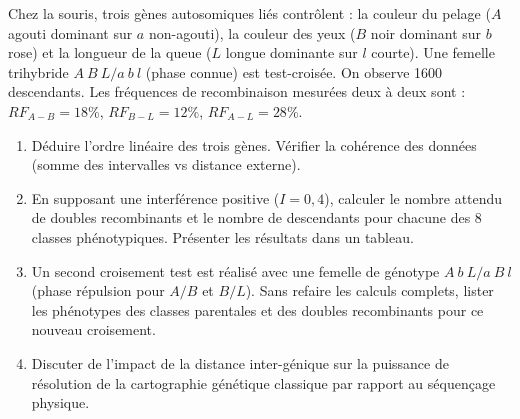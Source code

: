 \documentclass[11pt]{article}
\begin{document}
\begin{exercice}
Chez la souris, trois gènes autosomiques liés contrôlent : la couleur du pelage ($A$ agouti dominant sur $a$ non-agouti), la couleur des yeux ($B$ noir dominant sur $b$ rose) et la longueur de la queue ($L$ longue dominante sur $l$ courte).
Une femelle trihybride $A\ B\ L / a\ b\ l$ (phase connue) est test-croisée. On observe 1600 descendants.
Les fréquences de recombinaison mesurées deux à deux sont : $RF_{A-B} = 18\%$, $RF_{B-L} = 12\%$, $RF_{A-L} = 28\%$.
\begin{enumerate}
\item Déduire l'ordre linéaire des trois gènes. Vérifier la cohérence des données (somme des intervalles vs distance externe).
\item En supposant une interférence positive ($I = 0,4$), calculer le nombre attendu de doubles recombinants et le nombre de descendants pour chacune des 8 classes phénotypiques. Présenter les résultats dans un tableau.
\item Un second croisement test est réalisé avec une femelle de génotype $A\ b\ L / a\ B\ l$ (phase répulsion pour $A/B$ et $B/L$). Sans refaire les calculs complets, lister les phénotypes des classes parentales et des doubles recombinants pour ce nouveau croisement.
\item Discuter de l'impact de la distance inter-génique sur la puissance de résolution de la cartographie génétique classique par rapport au séquençage physique.
\end{enumerate}
\end{exercice}
\end{document}
